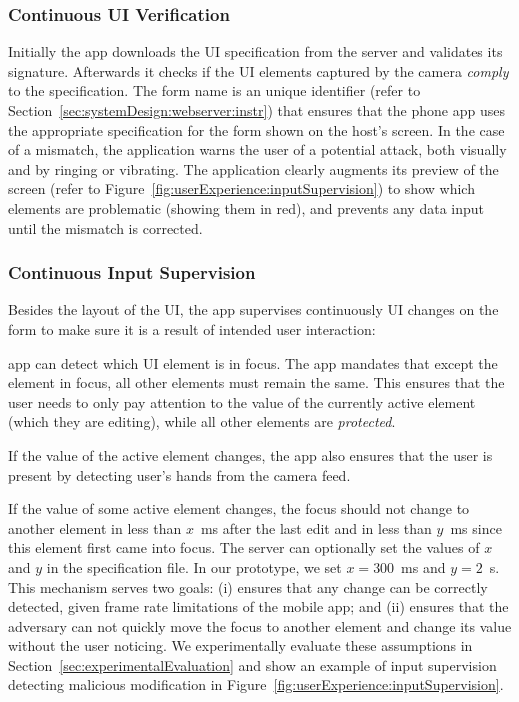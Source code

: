 \subsubsection{Continuous UI Verification}
\label{sec:systemDesign:phone:uiVerification}
Initially the app downloads the UI specification from the server and validates its signature. Afterwards it checks if the UI elements captured by the camera \textit{comply} to the specification. The form name is an unique identifier (refer to Section~\ref{sec:systemDesign:webserver:instr}) that ensures that the phone app uses the appropriate specification for the form shown on the host's screen. In the case of a mismatch, the application warns the user of a potential attack, both visually and by ringing or vibrating. The application clearly augments its preview of the screen (refer to Figure~\ref{fig:userExperience:inputSupervision}) to show which elements are problematic (showing them in red), and prevents any data input until the mismatch is corrected.

\subsubsection{Continuous Input Supervision}
\label{sec:systemDesign:phone:inputerSupervision}

Besides the layout of the UI, the app supervises continuously UI changes on the form to make sure it is a result of intended user interaction:

 \name app can detect which UI element is in focus. The app mandates that except the element in focus, all other elements must remain the same. This ensures that the user needs to only pay attention to the value of the currently active element (which they are editing), while all other elements are \emph{protected}.

 If the value of the active element changes, the app also ensures that the user is present by detecting user's hands from the camera feed.

 If the value of some active element changes, the focus should not change to another element in less than $x$~ms after the last edit and in less than $y$~ms since this element first came into focus. The server can optionally set the values of $x$ and $y$ in the specification file. In our prototype, we set $x=300$~ms and $y=2$~s. This mechanism serves two goals: (i) ensures that any change can be correctly detected, given frame rate limitations of the mobile app; and (ii) ensures that the adversary can not quickly move the focus to another element and change its value without the user noticing. We experimentally evaluate these assumptions in Section~\ref{sec:experimentalEvaluation} and show an example of input supervision detecting malicious modification in Figure~\ref{fig:userExperience:inputSupervision}.

